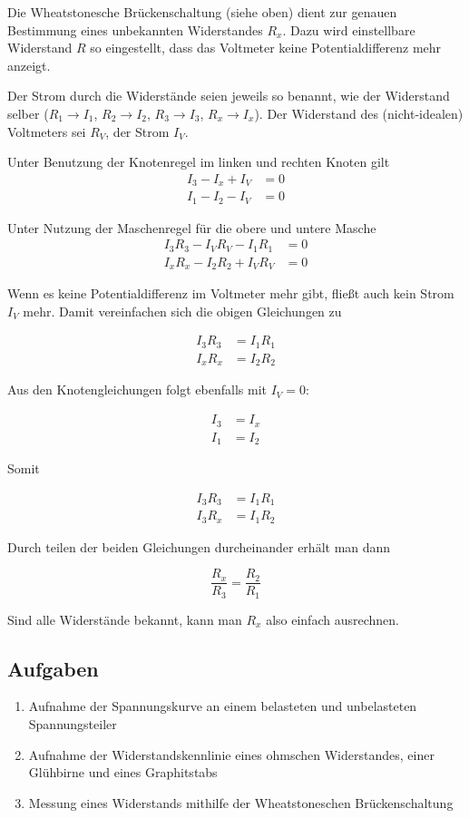 Die Wheatstonesche Brückenschaltung (siehe oben) dient zur genauen Bestimmung
eines unbekannten Widerstandes $R_x$. Dazu wird einstellbare Widerstand $R$ so
eingestellt, dass das Voltmeter keine Potentialdifferenz mehr anzeigt.

Der Strom durch die Widerstände seien jeweils so benannt, wie der Widerstand
selber ($R_1 \to I_1$, $R_2 \to I_2$, $R_3 \to I_3$, $R_x \to I_x$). Der
Widerstand des (nicht-idealen) Voltmeters sei $R_V$, der Strom $I_V$.

Unter Benutzung der Knotenregel im linken und rechten Knoten gilt
\begin{align}
  I_3 - I_x + I_V &= 0 \\
  I_1 - I_2 - I_V &= 0
\end{align}

Unter Nutzung der Maschenregel für die obere und untere Masche
\begin{align}
  I_3R_3 - I_V R_V - I_1 R_1 &= 0 \\
  I_xR_x - I_2 R_2 + I_V R_V &= 0
\end{align}

Wenn es keine Potentialdifferenz im Voltmeter mehr gibt, fließt auch kein Strom
$I_V$ mehr. Damit vereinfachen sich die obigen Gleichungen zu

\begin{align}
  I_3 R_3 &= I_1 R_1 \\
  I_x R_x &= I_2 R_2
\end{align}

Aus den Knotengleichungen folgt ebenfalls mit $I_V = 0$:

\begin{align}
  I_3 &= I_x \\
  I_1 &= I_2
\end{align}

Somit

\begin{align}
  I_3 R_3 &= I_1 R_1 \\
  I_3 R_x &= I_1 R_2
\end{align}

Durch teilen der beiden Gleichungen durcheinander erhält man dann

\begin{equation}
  \frac{R_x}{R_3} = \frac{R_2}{R_1}
\end{equation}

Sind alle Widerstände bekannt, kann man $R_x$ also einfach ausrechnen.

\subsection{Aufgaben}

\begin{enumerate}
  \item Aufnahme der Spannungskurve an einem belasteten und unbelasteten Spannungsteiler
  \item Aufnahme der Widerstandskennlinie eines ohmschen Widerstandes, einer Glühbirne und eines Graphitstabs
  \item Messung eines Widerstands mithilfe der Wheatstoneschen Brückenschaltung
\end{enumerate}
